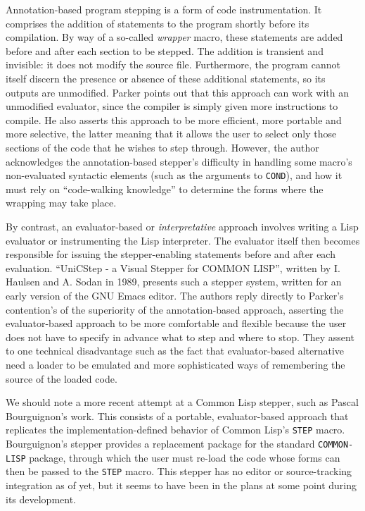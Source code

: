\documentclass[sigconf]{acmart}
\begin{document}
Annotation-based program stepping is a form of code instrumentation.
It comprises the addition of statements to the program shortly before
its compilation.  By way of a so-called \emph{wrapper} macro, these
statements are added before and after each section to be stepped.  The
addition is transient and invisible: it does not modify the source
file.  Furthermore, the program cannot itself discern the presence or
absence of these additional statements, so its outputs are unmodified.
Parker\cite{annotation-based} points out that this approach can work
with an unmodified evaluator, since the compiler is simply given more
instructions to compile.  He also asserts this approach to be more
efficient, more portable and more selective, the latter meaning that
it allows the user to select only those sections of the code that he
wishes to step through.  However, the author acknowledges the
annotation-based stepper's difficulty in handling some macro's
non-evaluated syntactic elements (such as the arguments to
\texttt{COND}), and how it must rely on ``code-walking
knowledge''\cite[I-4.8]{annotation-based} to determine the forms where
the wrapping may take place.

By contrast, an evaluator-based or \emph{interpretative} approach
involves writing a Lisp evaluator or instrumenting the Lisp
interpreter. The evaluator itself then becomes responsible for issuing
the stepper-enabling statements before and after each evaluation.
``UniCStep - a Visual Stepper for COMMON LISP'', written by I. Haulsen
and A. Sodan in 1989\cite{evaluation-based}, presents such a stepper
system, written for an early version of the GNU Emacs editor. The
authors reply directly to Parker's contention's of the superiority of
the annotation-based approach, asserting the evaluator-based approach
to be more comfortable and flexible because the user does not have to
specify in advance what to step and where to stop.  They assent to one
technical disadvantage such as the fact that evaluator-based
alternative need a loader to be emulated and more sophisticated ways
of remembering the source of the loaded code.

We should note a more recent attempt at a Common Lisp stepper, such as
Pascal Bourguignon's work\cite{bourguignon}.  This consists of a
portable, evaluator-based approach that replicates the
implementation-defined behavior of Common Lisp's \texttt{STEP} macro.
Bourguignon's stepper provides a replacement package for the standard
\texttt{COMMON-LISP} package, through which the user must re-load the
code whose forms can then be passed to the \texttt{STEP} macro.  This
stepper has no editor or source-tracking integration as of yet, but it
seems to have been in the plans at some point during its development.
\end{document}
